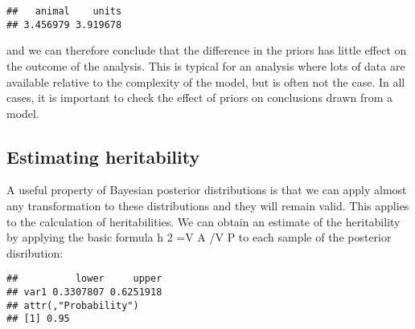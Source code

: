 \documentclass[
  12pt,
]{book}
\newenvironment{Shaded}{\begin{snugshade}}{\end{snugshade}}
\newcommand{\FloatTok}[1]{\textcolor[rgb]{0.00,0.00,0.81}{#1}}
\newcommand{\FunctionTok}[1]{\textcolor[rgb]{0.00,0.00,0.00}{#1}}
\newcommand{\NormalTok}[1]{#1}
\newcommand{\OtherTok}[1]{\textcolor[rgb]{0.56,0.35,0.01}{#1}}
\newcommand{\SpecialCharTok}[1]{\textcolor[rgb]{0.00,0.00,0.00}{#1}}
\newcommand{\StringTok}[1]{\textcolor[rgb]{0.31,0.60,0.02}{#1}}
\begin{document}
\begin{Shaded}
\end{Shaded}

\begin{verbatim}
##   animal    units 
## 3.456979 3.919678
\end{verbatim}

and we can therefore conclude that the difference in the priors has little effect on the outcome of the analysis. This is typical for an analysis where lots of data are available relative to the complexity of the model, but is often not the case. In all cases, it is important to check the effect of priors on conclusions drawn from a model.

\hypertarget{estimating-heritability-1}{%
\subsection{Estimating heritability}\label{estimating-heritability-1}}

A useful property of Bayesian posterior distributions is that we can apply almost any transformation to these distributions and they will remain valid. This applies to the calculation of heritabilities. We can obtain an estimate of the heritability by applying the basic formula h 2 =V A /V P to each sample of the posterior disribution:

\begin{Shaded}
\end{Shaded}

\begin{verbatim}
##          lower     upper
## var1 0.3307807 0.6251918
## attr(,"Probability")
## [1] 0.95
\end{verbatim}
\end{document}
